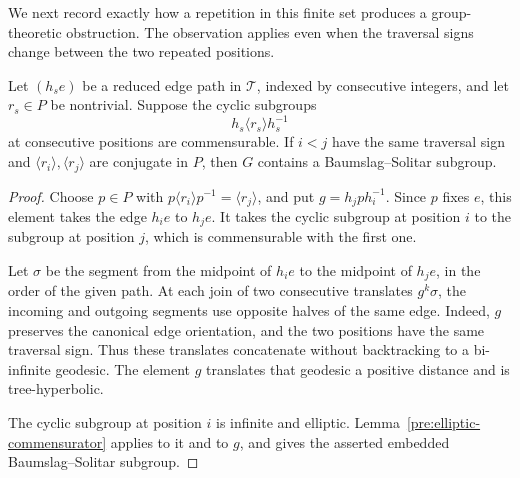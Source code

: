 We next record exactly how a repetition in this finite set produces a
group-theoretic obstruction.  The observation applies even when the
traversal signs change between the two repeated positions.

\begin{lemma}\label{stat:repetition}
Let $(h_s e)$ be a reduced edge path in $\mathcal T$, indexed by
consecutive integers, and let $r_s\in P$ be nontrivial.  Suppose the
cyclic subgroups
\[
                 h_s\langle r_s\rangle h_s^{-1}
\]
at consecutive positions are commensurable.  If $i<j$ have the same
traversal sign and $\langle r_i\rangle,\langle r_j\rangle$ are
conjugate in $P$, then $G$ contains a Baumslag--Solitar subgroup.
\end{lemma}
\begin{proof}
Choose $p\in P$ with
$p\langle r_i\rangle p^{-1}=\langle r_j\rangle$, and put
$g=h_jph_i^{-1}$.  Since $p$ fixes $e$, this element takes the edge
$h_i e$ to $h_j e$.  It takes the cyclic subgroup at position $i$ to
the subgroup at position $j$, which is commensurable with the first
one.

Let $\sigma$ be the segment from the midpoint of $h_i e$ to the
midpoint of $h_j e$, in the order of the given path.  At each join of
two consecutive translates $g^k\sigma$, the incoming and outgoing
segments use opposite halves of the same edge.  Indeed, $g$ preserves
the canonical edge orientation, and the two positions have the same
traversal sign.  Thus these translates concatenate without
backtracking to a bi-infinite geodesic.  The element $g$ translates
that geodesic a positive distance and is tree-hyperbolic.

The cyclic subgroup at position $i$ is infinite and elliptic.
Lemma~\ref{pre:elliptic-commensurator} applies to it and to $g$, and
gives the asserted embedded Baumslag--Solitar subgroup.
\end{proof}

